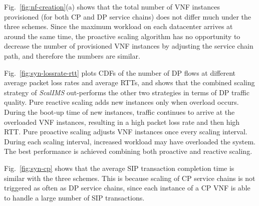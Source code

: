 
Fig.~\ref{fig:nf-creation}(a) shows that the total number of VNF instances provisioned (for both CP and DP service chains) does not differ much under the three schemes. Since the maximum workload on each datacenter arrives at around the same time, the proactive scaling algorithm has no opportunity to decrease the number of provisioned VNF instances by adjusting the service chain path, and therefore the numbers are similar.


Fig.~\ref{fig:syn-lossrate-rtt} plots CDFs of the number of DP flows at different average packet loss rates and average RTTs, and shows that the combined scaling strategy of {\em ScalIMS} out-performs the other two strategies in terms of DP traffic quality. %
 Pure reactive scaling adds new instances only when overload occurs. During the boot-up time of new instances, traffic continues to arrive at the overloaded VNF instances, resulting in a high packet loss rate and then high RTT. Pure proactive scaling adjusts VNF instances once every scaling interval. During each scaling interval, increased workload may have overloaded the system. The best performance is achieved combining both proactive and reactive scaling.

Fig.~\ref{fig:syn-cp} shows that the average SIP transaction completion time is similar with the three schemes. This is because scaling of CP service chains is not triggered as often as DP service chains, since each instance of a CP VNF is able to handle a large number of SIP transactions. %



